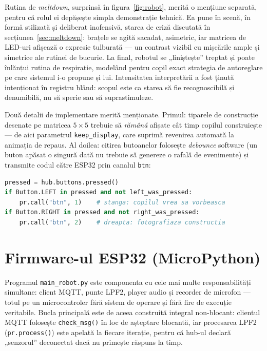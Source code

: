 Rutina de \emph{meltdown}, surprinsă în figura~\ref{fig:robot}, merită o mențiune separată, pentru că rolul ei depășește simpla demonstrație tehnică. Ea pune în scenă, în formă stilizată și deliberat inofensivă, starea de criză discutată în secțiunea~\ref{sec:meltdown}: brațele se agită sacadat, asimetric, iar matricea de LED-uri afișează o expresie tulburată — un contrast vizibil cu mișcările ample și simetrice ale rutinei de bucurie. La final, robotul se „liniștește” treptat și poate înlănțui rutina de respirație, modelând pentru copil exact strategia de autoreglare pe care sistemul i-o propune și lui. Intensitatea interpretării a fost ținută intenționat în registru blând: scopul este ca starea să fie recognoscibilă și denumibilă, nu să sperie sau să suprastimuleze.

Două detalii de implementare merită menționate. Primul: tiparele de construcție desenate pe matricea $5\times5$ trebuie să \emph{rămână} afișate cât timp copilul construiește — de aici parametrul \texttt{keep\_display}, care suprimă revenirea automată la animația de repaus. Al doilea: citirea butoanelor folosește \emph{debounce} software (un buton apăsat o singură dată nu trebuie să genereze o rafală de evenimente) și transmite codul către ESP32 prin canalul \texttt{btn}:

\begin{lstlisting}[language=Python, caption={Raportarea butoanelor către ESP32 (fragment).}, label={lst:btn}]
pressed = hub.buttons.pressed()
if Button.LEFT in pressed and not left_was_pressed:
    pr.call("btn", 1)    # stanga: copilul vrea sa vorbeasca
if Button.RIGHT in pressed and not right_was_pressed:
    pr.call("btn", 2)    # dreapta: fotografiaza constructia
\end{lstlisting}

\section{Firmware-ul ESP32 (MicroPython)}

Programul \texttt{main\_robot.py} este componenta cu cele mai multe responsabilități simultane: client MQTT, punte LPF2, player audio și recorder de microfon — totul pe un microcontroler fără sistem de operare și fără fire de execuție veritabile. Bucla principală este de aceea construită integral non-blocant: clientul MQTT folosește \texttt{check\_msg()} în loc de așteptare blocantă, iar procesarea LPF2 (\texttt{pr.process()}) este apelată la fiecare iterație, pentru că hub-ul declară „senzorul” deconectat dacă nu primește răspuns la timp.

